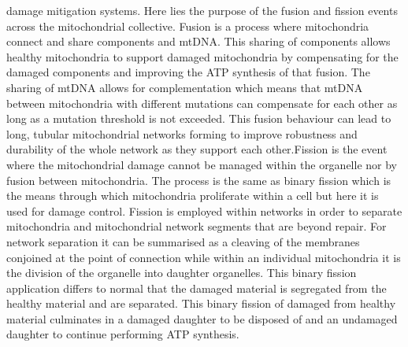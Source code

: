 damage mitigation systems. \newline\newline Here lies the purpose of the fusion and fission events across the mitochondrial collective. Fusion is a process where mitochondria connect and share components and mtDNA. This sharing of components allows healthy mitochondria to support damaged mitochondria by compensating for the damaged components and improving the ATP synthesis of that fusion. The sharing of mtDNA allows for complementation which means that mtDNA between mitochondria with different mutations can compensate for each other as long as a mutation threshold is not exceeded.\cite{MitoFus-2012} This fusion behaviour can lead to long, tubular mitochondrial networks forming to improve robustness and durability of the whole network as they support each other.\newline\newline Fission is the event where the mitochondrial damage cannot be managed within the organelle nor by fusion between mitochondria. The process is the same as binary fission which is the means through which mitochondria proliferate within a cell but here it is used for damage control. Fission is employed within networks in order to separate mitochondria and mitochondrial network segments that are beyond repair. For network separation it can be summarised as a cleaving of the membranes conjoined at the point of connection while within an individual mitochondria it is the division of the organelle into daughter organelles. This binary fission application differs to normal that the damaged material is segregated from the healthy material and are separated. This binary fission of damaged from healthy material culminates in a damaged daughter to be disposed of and an undamaged daughter to continue performing ATP synthesis.\cite{MitoFus-2012}
